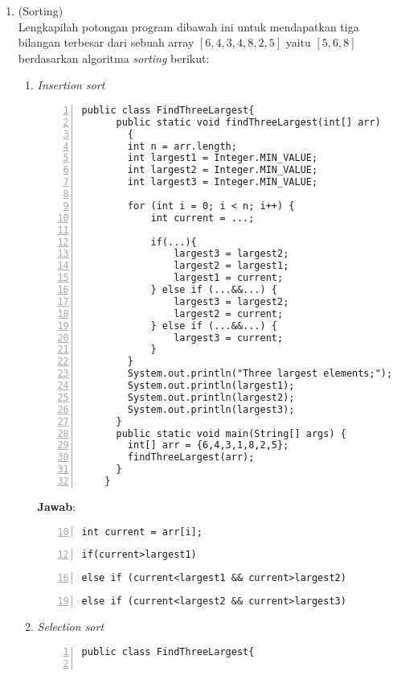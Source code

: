 \documentclass{article}
\newcommand{\jawab}{\textbf{Jawab}:}
\begin{document}
\begin{enumerate}
    \item (Sorting)\\
    Lengkapilah potongan program dibawah ini untuk mendapatkan tiga bilangan terbesar dari 
    sebuah array $[6,4,3,4,8,2,5]$ yaitu $[5,6,8]$ berdasarkan algoritma \textit{sorting} 
    berikut:
    \begin{enumerate}
      \item \textit{Insertion sort}
      \begin{lstlisting}[numbers=left,frame=single,numbersep= -8pt]
    public class FindThreeLargest{
      public static void findThreeLargest(int[] arr)
        {
        int n = arr.length;
        int largest1 = Integer.MIN_VALUE;
        int largest2 = Integer.MIN_VALUE;
        int largest3 = Integer.MIN_VALUE;

        for (int i = 0; i < n; i++) {
            int current = ...;

            if(...){
                largest3 = largest2;
                largest2 = largest1;
                largest1 = current;
            } else if (...&&...) {
                largest3 = largest2;
                largest2 = current;
            } else if (...&&...) {
                largest3 = current;
            }
        }
        System.out.println("Three largest elements;");
        System.out.println(largest1);
        System.out.println(largest2);
        System.out.println(largest3);
      }
      public static void main(String[] args) {
        int[] arr = {6,4,3,1,8,2,5};
        findThreeLargest(arr);
      }
    }
      \end{lstlisting}
      \jawab
      \begin{lstlisting}[numbers=left,frame=single,numbersep= -8pt,firstnumber = 10]
      int current = arr[i];
      \end{lstlisting}
      \begin{lstlisting}[numbers=left,frame=single,numbersep= -8pt,firstnumber = 12]
      if(current>largest1)
      \end{lstlisting}
      \begin{lstlisting}[numbers=left,frame=single,numbersep= -8pt,firstnumber = 16]
      else if (current<largest1 && current>largest2)
      \end{lstlisting}
      \begin{lstlisting}[numbers=left,frame=single,numbersep= -8pt,firstnumber = 19]
        else if (current<largest2 && current>largest3)
      \end{lstlisting}
      \item \textit{Selection sort}
      \begin{lstlisting}[numbers=left,frame=single,numbersep= -8pt]
    public class FindThreeLargest{


\end{lstlisting}
\end{enumerate}
\end{enumerate}
\end{document}
